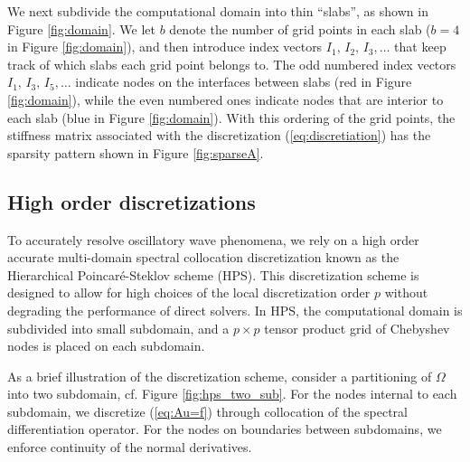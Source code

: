 \documentclass[11pt]{amsart}
\begin{document}
We next subdivide the computational domain into thin ``slabs'', as shown in 
Figure \ref{fig:domain}. We let $b$ denote the number of grid points in each
slab ($b=4$ in Figure \ref{fig:domain}), and then introduce index vectors $I_{1},\, I_{2},\, I_{3}, \dots$ that keep
track of which slabs each grid point belongs to. The odd numbered index
vectors $I_{1},\, I_{3},\,I_{5},\dots$ indicate nodes on the interfaces between
slabs (red in Figure \ref{fig:domain}), while the even numbered ones indicate
nodes that are interior to each slab (blue in Figure \ref{fig:domain}). 
With this ordering of the grid points, the stiffness matrix associated with the
discretization (\ref{eq:discretiation}) has the sparsity pattern shown in 
Figure \ref{fig:sparseA}.


\subsection{High order discretizations}
\label{sec:other_disc}
To accurately resolve oscillatory wave phenomena, we rely on a high order accurate
multi-domain spectral collocation discretization known as the Hierarchical 
Poincar\'e-Steklov scheme (HPS).
This discretization scheme is designed to allow for high choices of the local discretization order $p$ without degrading the performance of direct solvers.
In HPS, the computational domain is subdivided into small subdomain, and a $p\times p$ tensor product grid of Chebyshev nodes is placed on each subdomain.

As a brief illustration of the discretization scheme, consider a partitioning of $\Omega$ into two subdomain, cf. Figure \ref{fig:hps_two_sub}.
For the nodes internal to each subdomain, we discretize (\ref{eq:Au=f}) through collocation of the spectral differentiation operator.
For the nodes on boundaries between subdomains, we enforce continuity of the normal derivatives. 
\end{document}

